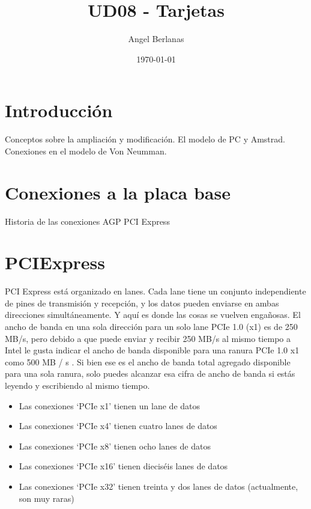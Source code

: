 \documentclass[11pt]{article}
\author{Angel Berlanas}
\date{\today}
\title{UD08 - Tarjetas}
\begin{document}
\maketitle
\tableofcontents


\section{Introducción}
\label{sec:org1d23c1f}

Conceptos sobre la ampliación y modificación.
El modelo de PC y Amstrad.
Conexiones en el modelo de Von Neumman.

\section{Conexiones a la placa base}
\label{sec:org2cb0b6c}

Historia de las conexiones
AGP
PCI Express

\section{PCIExpress}
\label{sec:org629c844}

PCI Express está organizado en lanes. Cada lane tiene un conjunto
independiente de pines de transmisión y recepción, y los datos pueden enviarse
en ambas direcciones simultáneamente. Y aquí es donde las cosas se vuelven
engañosas. El ancho de banda en una sola dirección para un solo lane PCIe 1.0
(x1) es de 250 MB/s, pero debido a que puede enviar y recibir 250 MB/s al
mismo tiempo a Intel le gusta indicar el ancho de banda disponible para una
ranura PCIe 1.0 x1 como 500 MB / s . Si bien ese es el ancho de banda total
agregado disponible para una sola ranura, solo puedes alcanzar esa cifra de
ancho de banda si estás leyendo y escribiendo al mismo tiempo.


\begin{itemize}
\item Las conexiones ‘PCIe x1’ tienen un lane de datos
\item Las conexiones ‘PCIe x4’ tienen cuatro lanes de datos
\item Las conexiones ‘PCIe x8’ tienen ocho lanes de datos
\item Las conexiones ‘PCIe x16’ tienen dieciséis lanes de datos
\item Las conexiones ‘PCIe x32’ tienen treinta y dos lanes de datos (actualmente, son muy raras)
\end{itemize}
\end{document}
